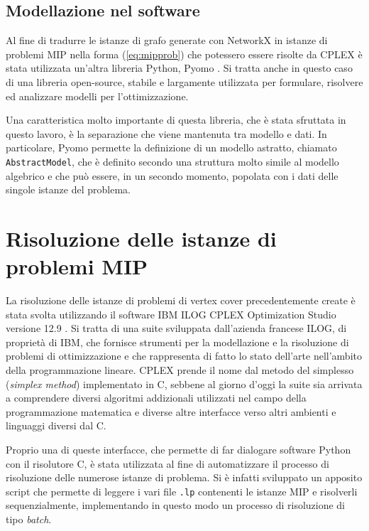 \subsection{Modellazione nel software}
Al fine di tradurre le istanze di grafo generate con NetworkX in istanze di problemi MIP nella forma (\ref{eq:mipprob}) che potessero essere risolte da CPLEX è stata utilizzata un'altra libreria Python, Pyomo \cite{bynum2021pyomo}\cite{hart2011pyomo}. Si tratta anche in questo caso di una libreria open-source, stabile e largamente utilizzata per formulare, risolvere ed analizzare modelli per l'ottimizzazione.

Una caratteristica molto importante di questa libreria, che è stata sfruttata in questo lavoro, è la separazione che viene mantenuta tra modello e dati.
In particolare, Pyomo permette la definizione di un modello astratto, chiamato \texttt{AbstractModel}, che è definito secondo una struttura molto simile al modello algebrico e che può essere, in un secondo momento, popolata con i dati delle singole istanze del problema.






\section{Risoluzione delle istanze di problemi MIP}
La risoluzione delle istanze di problemi di vertex cover precedentemente create è stata svolta utilizzando il software IBM ILOG CPLEX Optimization Studio versione 12.9 \cite{cplex}. Si tratta di una suite sviluppata dall'azienda francese ILOG, di proprietà di IBM, che fornisce strumenti per la modellazione e la risoluzione di problemi di ottimizzazione e che rappresenta di fatto lo stato dell'arte nell'ambito della programmazione lineare. CPLEX prende il nome dal metodo del simplesso (\textit{simplex method}) implementato in C, sebbene al giorno d'oggi la suite sia arrivata a comprendere diversi algoritmi addizionali utilizzati nel campo della programmazione matematica e diverse altre interfacce verso altri ambienti e linguaggi diversi dal C.  

Proprio una di queste interfacce,  che permette di far dialogare software Python con il risolutore C, è stata utilizzata al fine di automatizzare il processo di risoluzione delle numerose istanze di problema. Si è infatti sviluppato un apposito script che permette di leggere i vari file \texttt{.lp} contenenti le istanze MIP e risolverli sequenzialmente, implementando in questo modo un processo di risoluzione di tipo \textit{batch}. 

